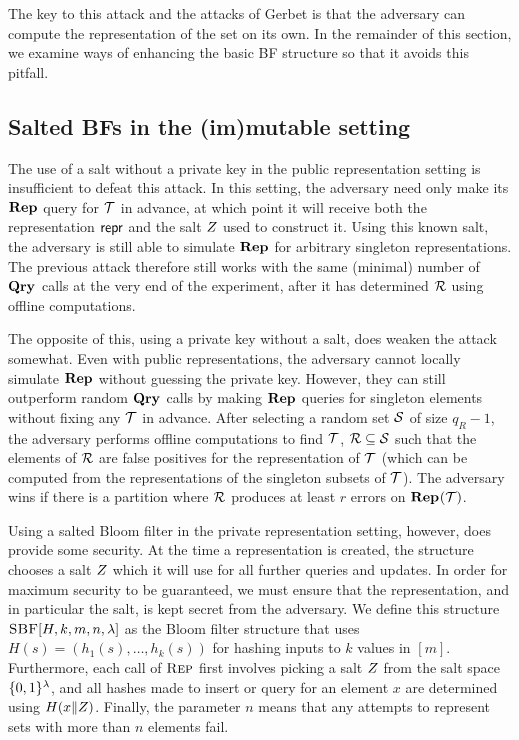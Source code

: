 
The key to this attack and the attacks of Gerbet \etal is that the adversary
can compute the representation of the set on its own. In the remainder of this
section, we examine ways of enhancing the basic BF structure so that it avoids
this pitfall.

\subsection{Salted BFs in the (im)mutable setting}

The use of a salt without a private key in the public representation setting is
insufficient to defeat this attack. In this setting, the adversary need only
make its $\mathbf{Rep}\hspace{0.5pt}$ query for $\mathcal{T}$ in advance, at which point it will receive
both the representation $\mathsf{repr}$ and the salt $Z$ used to construct it. Using
this known salt, the adversary is still able to simulate $\mathbf{Rep}\hspace{0.5pt}$ for arbitrary
singleton representations. The previous attack therefore still works with the
same (minimal) number of $\mathbf{Qry}\hspace{0.5pt}$ calls at the very end of the experiment, after
it has determined $\mathcal{R}$ using offline computations.

The opposite of this, using a private key without a salt, does weaken the attack
somewhat. Even with public representations, the adversary cannot locally
simulate $\mathbf{Rep}\hspace{0.5pt}$ without guessing the private key. However, they can still
outperform random $\mathbf{Qry}\hspace{0.5pt}$ calls by making $\mathbf{Rep}\hspace{0.5pt}$ queries for singleton elements
without fixing any $\mathcal{T}$ in advance. After selecting a random set $\mathcal{S}$ of
size $q_R-1$, the adversary performs offline computations to find $\mathcal{T}$,
$\mathcal{R} \subseteq \mathcal{S}$ such that the elements of $\mathcal{R}$ are false positives for
the representation of $\mathcal{T}$ (which can be computed from the representations of
the singleton subsets of $\mathcal{T}$). The adversary wins if there is a partition
where $\mathcal{R}$ produces at least $r$ errors on $\mathbf{Rep}\hspace{0.5pt}(\mathcal{T})$.


Using a salted Bloom filter in the private representation setting, however, does
provide some security. At the time a representation is created, the structure
chooses a salt $Z$ which it will use for all further queries and updates. In
order for maximum security to be guaranteed, we must ensure that the
representation, and in particular the salt, is kept secret from the adversary.
We define this structure $\textsc{SBF}[H,k,m,n,\lambda]$ as the Bloom filter structure
that uses $H(s) = (h_1(s),\ldots,h_k(s))$ for hashing inputs to $k$ values in
$[m]$. Furthermore, each call of $\textsc{Rep}$ first involves picking a salt $Z$
from the salt space $\{0,1\}^\lambda$, and all hashes made to insert or query for
an element $x$ are determined using $H(x \Vert Z)$. Finally, the parameter
$n$ means that any attempts to represent sets with more than $n$ elements fail.

